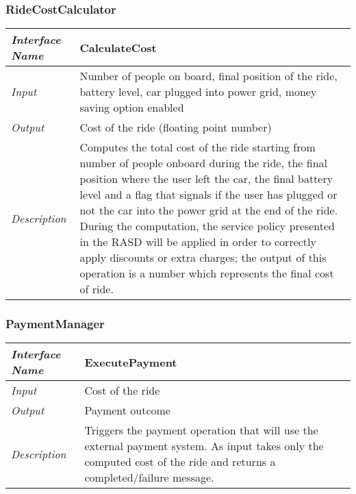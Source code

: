 \documentclass[11pt,a4paper]{report}
\begin{document}
\subsubsection{RideCostCalculator}
\begin{tabularx}{\textwidth}{|>{\em}l|X|}
	\hline
	Interface Name& CalculateCost\\
	\hline
	Input & Number of people on board, final position of the ride, battery level, car plugged into power grid, money saving option enabled\\
	\hline
	Output & Cost of the ride (floating point number)\\
	\hline
	Description &Computes the total cost of the ride starting from number of people onboard during the ride, the final position where the user left the car, the final battery level and a flag that signals if the user has plugged or not the car into the power grid at the end of the ride. During the computation, the service policy presented in the RASD will be applied in order to correctly apply discounts or extra charges; the output of this operation is a number which represents the final cost of ride.\\
	\hline
\end{tabularx}

\subsubsection{PaymentManager}
\begin{tabularx}{\textwidth}{|>{\em}l|X|}
	\hline
	Interface Name& ExecutePayment\\
	\hline
	Input & Cost of the ride\\
	\hline
	Output & Payment outcome\\
	\hline
	Description &Triggers the payment operation that will use the external payment system. As input takes only the computed cost of the ride and returns a completed/failure message.\\
	\hline
\end{tabularx}
\end{document}
